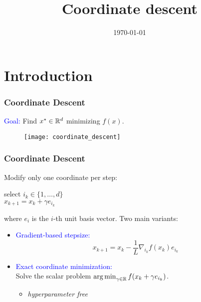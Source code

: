\documentclass[aspectratio=149]{beamer}
\title{Coordinate descent}
\date{\today}
\begin{document}
\maketitle
\frame{\tableofcontents}


\section{Introduction}%


\begin{frame}
  \frametitle{Coordinate Descent}
  \textcolor{blue}{Goal:} Find $x^* \in \mathbb{R}^d$ minimizing $f(x)$.

  \begin{figure}[ht]
    \centering
    \texttt{[image: coordinate\_descent]}
    \caption{\label{fig:label} }
  \end{figure}
\end{frame}

\begin{frame}
  \frametitle{Coordinate Descent}
  Modify only one coordinate per step:
  \begin{block}{}
    \begin{center}
      select $i_k \in \{1, \dots, d\}$\\
      $x_{k+1} = x_k + \gamma e_{i_k}$
    \end{center}
  \end{block}
  where $e_i$ is the $i$-th unit basis vector.
  Two main variants:
  \begin{itemize}
    \item \textcolor{blue}{Gradient-based stepsize:}
          \begin{equation}
            x_{k+1} = x_k - \frac1L \nabla_{i_k}f(x_k) e_{i_k}
          \end{equation}
    \item \textcolor{blue}{Exact coordinate minimization:} \\
          Solve the scalar problem $\operatorname*{arg\,min}_{\gamma\in \mathbb{R}} f(x_k + \gamma e_{i_k})$.
          \begin{itemize}
            \item \textit{hyperparameter free}
          \end{itemize}
  \end{itemize}
\end{frame}
\end{document}

